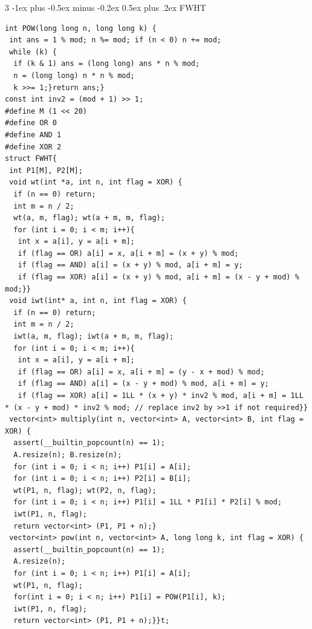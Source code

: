 \documentclass[8pt,a4paper,onesided]{article}
\makeatletter
\renewcommand{\subsection}{\@startsection{subsection}{2}{0mm}
    {-1ex plus -0.5ex minus -0.2ex} %
    {0.5ex plus .2ex}                %
    {\normalfont\large\bfseries}}    %
\makeatother
\begin{document}
\begin{multicols}{3}
\subsection{FWHT}
\begin{verbatim}
int POW(long long n, long long k) {
 int ans = 1 % mod; n %= mod; if (n < 0) n += mod;
 while (k) {
  if (k & 1) ans = (long long) ans * n % mod;
  n = (long long) n * n % mod;
  k >>= 1;}return ans;}
const int inv2 = (mod + 1) >> 1;
#define M (1 << 20)
#define OR 0
#define AND 1
#define XOR 2
struct FWHT{
 int P1[M], P2[M];
 void wt(int *a, int n, int flag = XOR) {
  if (n == 0) return;
  int m = n / 2;
  wt(a, m, flag); wt(a + m, m, flag);
  for (int i = 0; i < m; i++){
   int x = a[i], y = a[i + m];
   if (flag == OR) a[i] = x, a[i + m] = (x + y) % mod;
   if (flag == AND) a[i] = (x + y) % mod, a[i + m] = y;
   if (flag == XOR) a[i] = (x + y) % mod, a[i + m] = (x - y + mod) % mod;}}
 void iwt(int* a, int n, int flag = XOR) {
  if (n == 0) return;
  int m = n / 2;
  iwt(a, m, flag); iwt(a + m, m, flag);
  for (int i = 0; i < m; i++){
   int x = a[i], y = a[i + m];
   if (flag == OR) a[i] = x, a[i + m] = (y - x + mod) % mod;
   if (flag == AND) a[i] = (x - y + mod) % mod, a[i + m] = y;
   if (flag == XOR) a[i] = 1LL * (x + y) * inv2 % mod, a[i + m] = 1LL * (x - y + mod) * inv2 % mod; // replace inv2 by >>1 if not required}}
 vector<int> multiply(int n, vector<int> A, vector<int> B, int flag = XOR) {
  assert(__builtin_popcount(n) == 1);
  A.resize(n); B.resize(n);
  for (int i = 0; i < n; i++) P1[i] = A[i];
  for (int i = 0; i < n; i++) P2[i] = B[i];
  wt(P1, n, flag); wt(P2, n, flag);
  for (int i = 0; i < n; i++) P1[i] = 1LL * P1[i] * P2[i] % mod;
  iwt(P1, n, flag);
  return vector<int> (P1, P1 + n);}
 vector<int> pow(int n, vector<int> A, long long k, int flag = XOR) {
  assert(__builtin_popcount(n) == 1);
  A.resize(n);
  for (int i = 0; i < n; i++) P1[i] = A[i];
  wt(P1, n, flag);
  for(int i = 0; i < n; i++) P1[i] = POW(P1[i], k);
  iwt(P1, n, flag);
  return vector<int> (P1, P1 + n);}}t;
\end{verbatim}

\end{multicols}
\end{document}
